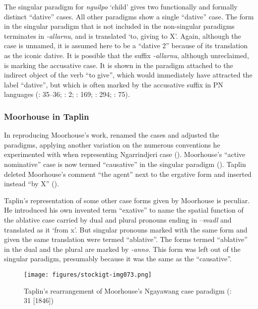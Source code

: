 The singular paradigm for \textit{nguilpo} `child' gives two functionally and formally distinct “dative” cases. All other paradigms show a single “dative” case. The form in the singular paradigm that is not included in the non-singular paradigms terminates in \textit{-allarnu}, and is translated `to, giving to X'. Again, although the case is unnamed, it is assumed here to be a “dative 2” because of its translation as the iconic dative. It is possible that the suffix \textit{-allarnu}, although unreclaimed, is marking the accusative case. It is shown in the paradigm attached to the indirect object of the verb ``to give'', which would immediately have attracted the label ``dative'', but which is often marked by the accusative suffix in PN languages (\citealt{blake_case_1977}: 35--36; \citealt{schebeck_adnjamathanha_1973}: 2; \citealt{wilkins_mparntwe_1989}: 169; \citealt{henderson_topics_2013}: 294; \citealt{hercus_grammar_1999}: 75).

\subsubsection{Moorhouse in Taplin \citeyearpar{taplin_1879a_nodate}}
\label{sec:key:6.4.1.4}

In reproducing Moorhouse’s work, \citet[31]{taplin_1879a_nodate} renamed the cases and adjusted the paradigms, applying another variation on the numerous conventions he experimented with when representing Ngarrindjeri case (). Moorhouse’s “active nominative” case is now termed “causative” in the singular paradigm (). Taplin deleted Moorhouse’s comment “the agent” next to the ergative form and inserted instead “by X” ().

Taplin’s representation of some other case forms given by Moorhouse is peculiar. He introduced his own invented term “exative” to name the spatial function of the ablative case carried by dual and plural pronouns ending in –\textit{mudl} and translated as it `from x'. But singular pronouns marked with the same form and given the same translation were termed “ablative''. The forms termed “ablative” in the dual and the plural are marked by \textit{-anno.} This form was left out of the singular paradigm, presumably because it was the same as the “causative''.

\begin{figure}[t]
\texttt{[image: figures/stockigt-img073.png]}
\caption{Taplin’s rearrangement of Moorhouse’s Ngayawang case paradigm (\citeyear{taplin_1879a_nodate}: 31 [1846])}
\label{fig:key:127}
\end{figure}

